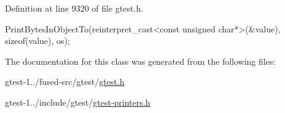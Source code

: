 \-Definition at line 9320 of file gtest.\-h.


\begin{DoxyCode}
                                                         {
    PrintBytesInObjectTo(reinterpret_cast<const unsigned char*>(&value),
                         sizeof(value), os);
  }
\end{DoxyCode}


\-The documentation for this class was generated from the following files\-:\begin{DoxyCompactItemize}
\item 
gtest-\/1../fused-\/src/gtest/\hyperlink{fused-src_2gtest_2gtest_8h}{gtest.\-h}\item 
gtest-\/1../include/gtest/\hyperlink{gtest-printers_8h}{gtest-\/printers.\-h}\end{DoxyCompactItemize}
